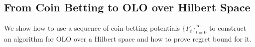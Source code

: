 \subsection{From Coin Betting to OLO over Hilbert Space}
\label{section:reduction_hilbert}

We show how to use a sequence of coin-betting potentials $\{F_t\}_{t=0}^\infty$
to construct an algorithm for \ac{OLO} over a Hilbert space
and how to prove regret bound for it.
% 
% 
% 
